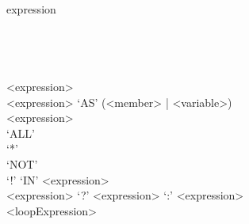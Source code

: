 \documentclass[11pt,a4paper]{report}
\begin{document}
\begin{appendices}
\begin{samepage}
\begin{gram*}
\begin{rrdiag*}{expression}
		 \\ 
		 \\ 
		 \\ 
		 \\ 
		 \\ 
		\est <expression> \\ %
		<expression> `AS' (<member> | <variable>) \\ %
		<expression> \sst \\ `ALL' \\ `*' \est \sst \\ `NOT' \\ `!' \est `IN' <expression> \\ %
		<expression> `?' <expression> `:' <expression> \\ %
		<loopExpression> %
		\est
	\end{rrdiag*}
\end{gram*}
\end{samepage}

\end{appendices}
\end{document}

